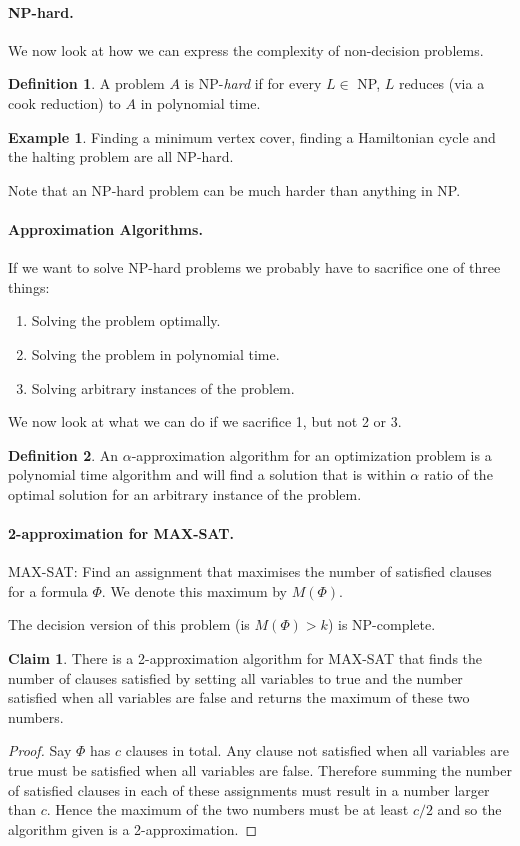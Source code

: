 \documentclass[11pt,a4paper]{article}
\theoremstyle{definition}
\newtheorem{claim}{Claim}
\newtheorem{defn}{Definition}
\newtheorem*{ex}{Example}
\begin{document}
\paragraph{NP-hard.}
We now look at how we can express the complexity of non-decision problems.
\begin{defn}
A problem $A$ is NP-\emph{hard} if for every $L\in$ NP, $L$ reduces (via a cook reduction) to $A$ in polynomial time.
\end{defn}
\begin{ex}
Finding a minimum vertex cover, finding a Hamiltonian cycle and the halting problem are all NP-hard.
\end{ex}
Note that an NP-hard problem can be much harder than anything in NP.

\paragraph{Approximation Algorithms.}
If we want to solve NP-hard problems we probably have to sacrifice one of three things:
\begin{enumerate}
\item Solving the problem optimally.
\item Solving the problem in polynomial time.
\item Solving arbitrary instances of the problem.
\end{enumerate}

We now look at what we can do if we sacrifice 1, but not 2 or 3.

\begin{defn}
An $\alpha$-approximation algorithm for an optimization problem is a polynomial time algorithm and will find a solution that is within $\alpha$ ratio of the optimal solution for an arbitrary instance of the problem.
\end{defn}

\paragraph{2-approximation for MAX-SAT.}
MAX-SAT: Find an assignment that maximises the number of satisfied clauses for a formula $\Phi$.
We denote this maximum by $M(\Phi)$.

The decision version of this problem (is $M(\Phi) > k$) is NP-complete.

\begin{claim}
There is a 2-approximation algorithm for MAX-SAT that finds the number of clauses satisfied by setting all variables to true and the number satisfied when all variables are false and returns the maximum of these two numbers.
\end{claim}
\begin{proof}
Say $\Phi$ has $c$ clauses in total.
Any clause not satisfied when all variables are true must be satisfied when all variables are false.
Therefore summing the number of satisfied clauses in each of these assignments must result in a number larger than $c$.
Hence the maximum of the two numbers must be at least $c/2$ and so the algorithm given is a 2-approximation.
\end{proof}
\end{document}
